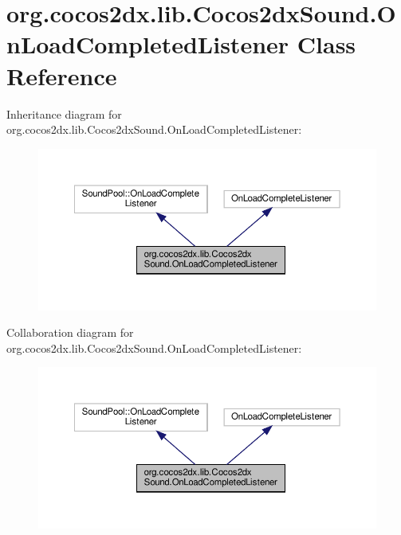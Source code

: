 \hypertarget{classorg_1_1cocos2dx_1_1lib_1_1Cocos2dxSound_1_1OnLoadCompletedListener}{}\section{org.\+cocos2dx.\+lib.\+Cocos2dx\+Sound.\+On\+Load\+Completed\+Listener Class Reference}
\label{classorg_1_1cocos2dx_1_1lib_1_1Cocos2dxSound_1_1OnLoadCompletedListener}


Inheritance diagram for org.\+cocos2dx.\+lib.\+Cocos2dx\+Sound.\+On\+Load\+Completed\+Listener\+:
\nopagebreak
\begin{figure}[H]
\begin{center}
\leavevmode
\includegraphics[width=350pt]{classorg_1_1cocos2dx_1_1lib_1_1Cocos2dxSound_1_1OnLoadCompletedListener__inherit__graph}
\end{center}
\end{figure}


Collaboration diagram for org.\+cocos2dx.\+lib.\+Cocos2dx\+Sound.\+On\+Load\+Completed\+Listener\+:
\nopagebreak
\begin{figure}[H]
\begin{center}
\leavevmode
\includegraphics[width=350pt]{classorg_1_1cocos2dx_1_1lib_1_1Cocos2dxSound_1_1OnLoadCompletedListener__coll__graph}
\end{center}
\end{figure}
